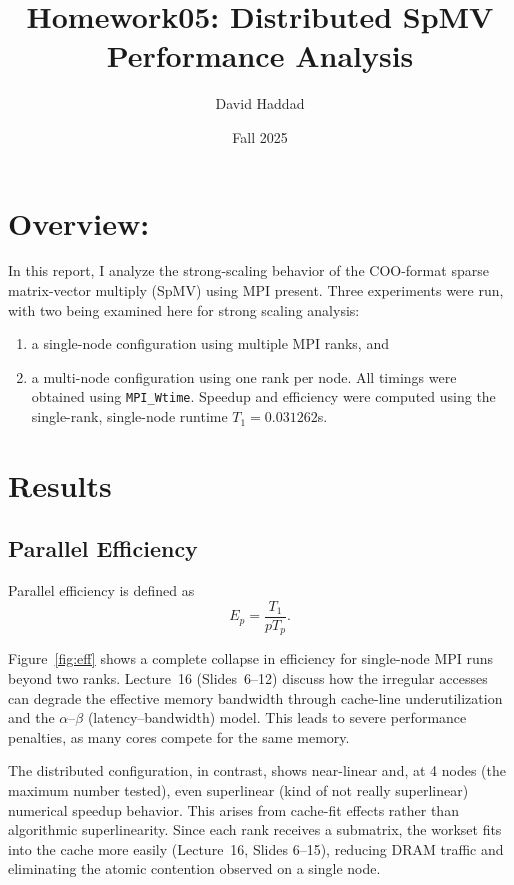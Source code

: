 \documentclass[twocolumn]{article}
\title{Homework05: Distributed SpMV Performance Analysis}
\author{David Haddad}
\date{Fall 2025}
\begin{document}
\maketitle

\section{Overview:}
In this report, I analyze the strong-scaling behavior of the COO-format sparse matrix-vector multiply (SpMV) using MPI present. Three experiments were run, with two being examined here for strong scaling analysis:
\begin{enumerate}
    \item a single-node configuration using multiple MPI ranks, and 
    \item a multi-node configuration using one rank per node. All timings were obtained using \texttt{MPI\_Wtime}. Speedup and efficiency were computed using the single-rank, single-node runtime $T_1 = 0.031262$s.
\end{enumerate}

\section{Results}
\subsection{Parallel Efficiency}
Parallel efficiency is defined as 
\[
E_p = \frac{T_1}{p T_p}.
\]

Figure~\ref{fig:eff} shows a complete collapse in efficiency for single-node MPI runs beyond two ranks. Lecture~16 (Slides~6--12) discuss how the irregular accesses can degrade the effective memory bandwidth through cache-line underutilization and the $\alpha$--$\beta$ (latency--bandwidth) model. This leads to severe performance penalties, as many cores compete for the same memory.

The distributed configuration, in contrast, shows near-linear and, at 4 nodes (the maximum number tested), even superlinear (kind of not really superlinear) numerical speedup behavior. This arises from cache-fit effects rather than algorithmic superlinearity. Since each rank receives a submatrix, the workset fits into the cache more easily (Lecture~16, Slides 6--15), reducing DRAM traffic and eliminating the atomic contention observed on a single node.
\end{document}
